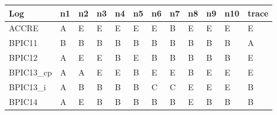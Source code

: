 \begin{tabular}{llllllllllll}
\toprule
        Log &                         n1 &                         n2 &                         n3 &                         n4 &                         n5 &                         n6 &                         n7 &                         n8 &                         n9 &                        n10 &                      trace \\
\midrule
      ACCRE & \cellcolor[HTML]{FFFFFF} A & \cellcolor[HTML]{56B4E9} E & \cellcolor[HTML]{56B4E9} E & \cellcolor[HTML]{56B4E9} E & \cellcolor[HTML]{56B4E9} E & \cellcolor[HTML]{56B4E9} E & \cellcolor[HTML]{D55E00} B & \cellcolor[HTML]{56B4E9} E & \cellcolor[HTML]{56B4E9} E & \cellcolor[HTML]{56B4E9} E & \cellcolor[HTML]{56B4E9} E \\
     BPIC11 & \cellcolor[HTML]{D55E00} B & \cellcolor[HTML]{D55E00} B & \cellcolor[HTML]{D55E00} B & \cellcolor[HTML]{D55E00} B & \cellcolor[HTML]{D55E00} B & \cellcolor[HTML]{D55E00} B & \cellcolor[HTML]{D55E00} B & \cellcolor[HTML]{D55E00} B & \cellcolor[HTML]{D55E00} B & \cellcolor[HTML]{D55E00} B & \cellcolor[HTML]{FFFFFF} A \\
     BPIC12 & \cellcolor[HTML]{FFFFFF} A & \cellcolor[HTML]{56B4E9} E & \cellcolor[HTML]{56B4E9} E & \cellcolor[HTML]{D55E00} B & \cellcolor[HTML]{56B4E9} E & \cellcolor[HTML]{D55E00} B & \cellcolor[HTML]{D55E00} B & \cellcolor[HTML]{D55E00} B & \cellcolor[HTML]{D55E00} B & \cellcolor[HTML]{D55E00} B & \cellcolor[HTML]{56B4E9} E \\
 BPIC13\_cp & \cellcolor[HTML]{FFFFFF} A & \cellcolor[HTML]{FFFFFF} A & \cellcolor[HTML]{56B4E9} E & \cellcolor[HTML]{56B4E9} E & \cellcolor[HTML]{D55E00} B & \cellcolor[HTML]{56B4E9} E & \cellcolor[HTML]{56B4E9} E & \cellcolor[HTML]{D55E00} B & \cellcolor[HTML]{56B4E9} E & \cellcolor[HTML]{56B4E9} E & \cellcolor[HTML]{56B4E9} E \\
  BPIC13\_i & \cellcolor[HTML]{FFFFFF} A & \cellcolor[HTML]{D55E00} B & \cellcolor[HTML]{D55E00} B & \cellcolor[HTML]{D55E00} B & \cellcolor[HTML]{D55E00} B & \cellcolor[HTML]{E69F00} C & \cellcolor[HTML]{E69F00} C & \cellcolor[HTML]{56B4E9} E & \cellcolor[HTML]{56B4E9} E & \cellcolor[HTML]{56B4E9} E & \cellcolor[HTML]{D55E00} B \\
     BPIC14 & \cellcolor[HTML]{FFFFFF} A & \cellcolor[HTML]{56B4E9} E & \cellcolor[HTML]{D55E00} B & \cellcolor[HTML]{D55E00} B & \cellcolor[HTML]{D55E00} B & \cellcolor[HTML]{D55E00} B & \cellcolor[HTML]{D55E00} B & \cellcolor[HTML]{56B4E9} E & \cellcolor[HTML]{D55E00} B & \cellcolor[HTML]{D55E00} B & \cellcolor[HTML]{D55E00} B \\

\end{tabular}
